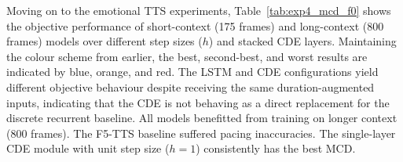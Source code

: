 Moving on to the emotional TTS experiments, Table~\ref{tab:exp4_mcd_f0} shows the objective performance of short-context (175 frames) and long-context (800 frames) models over different step sizes ($h$) and stacked \ac{CDE} layers. Maintaining the colour scheme from earlier, the \colorbox{bestblue}{best}, \colorbox{secondorange}{second-best}, and \colorbox{worstred}{worst} results are indicated by \colorbox{bestblue}{blue}, \colorbox{secondorange}{orange}, and \colorbox{worstred}{red}. The \ac{LSTM} and \ac{CDE} configurations yield different objective behaviour despite receiving the same duration-augmented inputs, indicating that the \ac{CDE} is not behaving as a direct replacement for the discrete recurrent baseline. All models benefitted from training on longer context (800 frames). The F5-TTS baseline suffered pacing inaccuracies. The single-layer \ac{CDE} module with unit step size ($h=1$) consistently has the best MCD.


